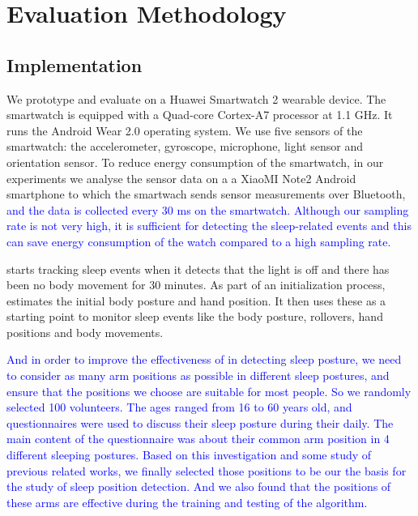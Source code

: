\section{Evaluation Methodology}
\label{sec:expsetup}

\subsection{Implementation \label{sec:implementation}}
We prototype and evaluate \systemname on a Huawei Smartwatch 2 wearable device. The smartwatch is equipped with a Quad-core Cortex-A7
processor at 1.1 GHz.  It runs the Android Wear 2.0 operating system. We use five sensors of the smartwatch: the accelerometer, gyroscope,
microphone, light sensor and orientation sensor. To reduce energy consumption of the smartwatch, in our experiments we analyse the sensor data on a a XiaoMI Note2 Android smartphone to which the smartwach sends sensor measurements over Bluetooth, \textcolor{blue}{and the data is collected every 30 ms on the smartwatch. Although our sampling rate is not very high, it is sufficient for detecting the sleep-related events and this can save energy consumption of the watch compared to a high sampling rate.} %

\systemname starts tracking sleep events when it detects that the light is off and there has been no body movement for 30 minutes. As part of an initialization process, \systemname estimates the initial body posture and hand position. It then uses these as a starting point to monitor sleep events like the body posture, rollovers, hand positions and body movements.

\textcolor{blue}{And in order to improve the effectiveness of {\systemname} in detecting sleep posture, we need to consider as many arm positions as possible in different sleep postures, and ensure that the positions we choose are suitable for most people. So we randomly selected 100 volunteers. The ages ranged from 16 to 60 years old, and questionnaires were used to discuss their sleep posture during their daily. The main content of the questionnaire was about their common arm position in 4 different sleeping postures. Based on this investigation and some study of previous related works\cite{position2014,HandPosition2}, we finally selected those positions to be our the basis for the study of sleep position detection. And we also found that the positions of these arms are effective during the training and testing of the algorithm.}



